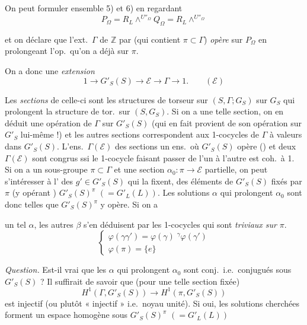\documentclass[11pt,a4paper]{article}
\begin{document}
On peut formuler ensemble 5) et 6) en regardant
\[
P_\Omega = R_L \wedge^{U''_\Omega} Q_\Omega = R_L \wedge^{U''_\Omega}
\]

et on déclare que l'ext.\ $\Gamma$ de $\mathbb{Z}$ par
 (qui contient
$\pi \subset \Gamma$) \emph{opère} sur $P_\Omega$ en \struck{\ill{}} prolongeant
l'op.\ qu'on a déjà sur $\pi$.

On a donc une \emph{extension}
\[
1 \to G'_S(S) \to \mathcal{E} \to \Gamma \to 1 . \qquad (\mathcal{E})
\]


Les \emph{sections} de celle-ci sont les structures de torseur sur
$(S, \Gamma ; G_S)$ sur $G_S$ qui prolongent la structure de tor.\ sur
$(S, G_S)$. Si on a une telle section, on en déduit une opération de $\Gamma$
sur $G'_S(S)$ (qui en fait provient de son opération sur $G'_S$ lui-même !) et
les autres sections correspondent aux 1-cocycles de $\Gamma$ à valeurs dans
$G'_S(S)$.  L'ens.\ $\Gamma(\mathcal{E})$ des sections
 un ens.\ où $G'_S(S)$ opère ()
et deux \struck{\ill{}} $\Gamma(\mathcal{E})$ sont congrus ssi le 1-cocycle
faisant passer de l'un à l'autre est coh.\ à 1. Si on a un sous-groupe
$\pi \subset \Gamma$ et une section $\alpha_0 : \pi \to \mathcal{E}$ partielle,
on peut s'intéresser à l' des $g' \in G'_S(S)$ qui la fixent,
\ill{} des éléments de $G'_S(S)$ fixés par $\pi$ (y opérant ) $G'_S(S)^{\pi}$ $(= G'_L(L))$. Les solutions $\alpha$ qui prolongent
$\alpha_0$ sont donc telles que $G'_S(S)^{\pi}$ y opère. Si on a

un tel $\alpha$, les autres $\beta$ s'en déduisent par les 1-cocycles qui sont
\emph{triviaux sur} $\pi$.
\[
\begin{cases}
\varphi(\gamma\gamma') = \varphi(\gamma)\; {}^{\gamma}\varphi(\gamma') \\
\varphi(\pi) = \{e\}
\end{cases}
\]

\emph{Question.} Est-il vrai que les $\alpha$ qui prolongent $\alpha_0$ sont
conj.\ i.e.\ conjugués sous $G'_S(S)$ ? Il suffirait de savoir que (pour une
telle section fixée)
\[
H^{1}(\Gamma, G'_S(S)) \to H^{1}(\pi, G'_S(S))
\]
est injectif (ou plutôt « injectif » i.e.\ noyau unité). Si oui, les solutions
cherchées forment un \struck{\ill{}} espace homogène sous
$G'_S(S)^{\pi}$ $(= G'_L(L))$
\end{document}
